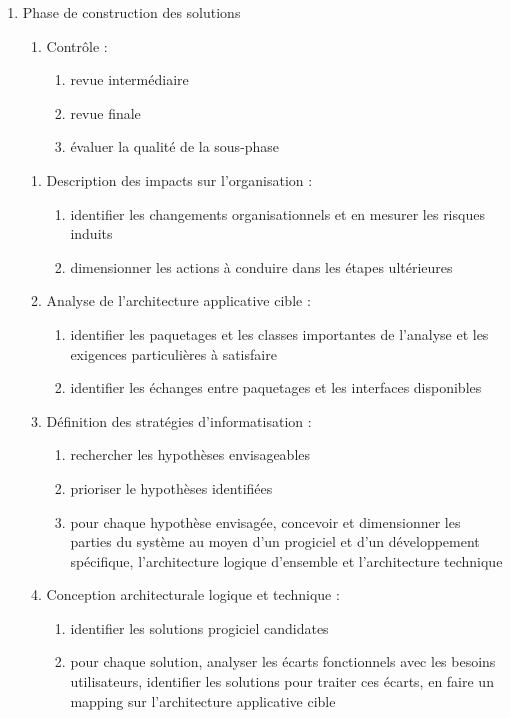 \begin{enumerate}
\item Phase de construction des solutions
          \begin{enumerate}
            \item Contrôle :
                \begin{enumerate}
                  \item revue intermédiaire
                  \item revue finale
                  \item évaluer la qualité de la sous-phase
                \end{enumerate}
          \end{enumerate}

          \begin{enumerate}
            \item Description des impacts sur l'organisation : 
                \begin{enumerate}
                  \item identifier les changements organisationnels et en mesurer les risques induits
                  \item dimensionner les actions à conduire dans les étapes ultérieures
                \end{enumerate}
            \item Analyse de l'architecture applicative cible : 
                \begin{enumerate}
                  \item identifier les paquetages et les classes importantes de l'analyse et les exigences particulières à satisfaire 
                  \item identifier les échanges entre paquetages et les interfaces disponibles 
                \end{enumerate}
            \item Définition des stratégies d'informatisation : 
                \begin{enumerate}
                  \item rechercher les hypothèses envisageables 
                  \item prioriser le hypothèses identifiées
                  \item pour chaque hypothèse envisagée, concevoir et dimensionner les parties du système au moyen d'un progiciel et d'un développement spécifique, l'architecture logique d'ensemble et l'architecture technique
                \end{enumerate}
            \item Conception architecturale logique et technique : 
                \begin{enumerate}
                  \item identifier les solutions progiciel candidates 
                  \item pour chaque solution, analyser les écarts fonctionnels avec les besoins utilisateurs, identifier les solutions pour traiter ces écarts, en faire un mapping sur l'architecture applicative cible
                \end{enumerate}
          \end{enumerate}


\end{enumerate}
